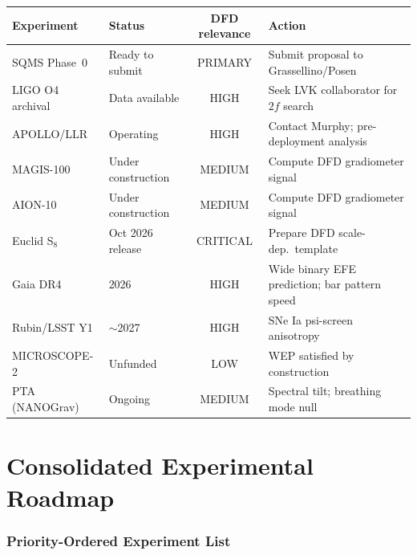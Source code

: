 \documentclass[11pt]{article}
\begin{document}
\begin{center}
\renewcommand{\arraystretch}{1.3}
\begin{tabular}{@{}p{3.5cm}p{3cm}cp{4cm}@{}}
\toprule
\textbf{Experiment} & \textbf{Status} & \textbf{DFD relevance} &
\textbf{Action} \\
\midrule
SQMS Phase~0 & Ready to submit & PRIMARY & Submit proposal to
Grassellino/Posen \\
LIGO O4 archival & Data available & HIGH & Seek LVK collaborator
for $2f$ search \\
APOLLO/LLR & Operating & HIGH & Contact Murphy; pre-deployment
analysis \\
MAGIS-100 & Under construction & MEDIUM & Compute DFD gradiometer
signal \\
AION-10 & Under construction & MEDIUM & Compute DFD gradiometer
signal \\
Euclid S$_8$ & Oct 2026 release & CRITICAL & Prepare DFD scale-dep.\
template \\
Gaia DR4 & 2026 & HIGH & Wide binary EFE prediction; bar pattern
speed \\
Rubin/LSST Y1 & $\sim$2027 & HIGH & SNe Ia psi-screen anisotropy \\
MICROSCOPE-2 & Unfunded & LOW & WEP satisfied by construction \\
PTA (NANOGrav) & Ongoing & MEDIUM & Spectral tilt; breathing mode
null \\
\bottomrule
\end{tabular}
\end{center}


\part{Consolidated Experimental Roadmap}
\label{part:roadmap}

\section{Priority-Ordered Experiment List}
\label{sec:priority}
\end{document}
